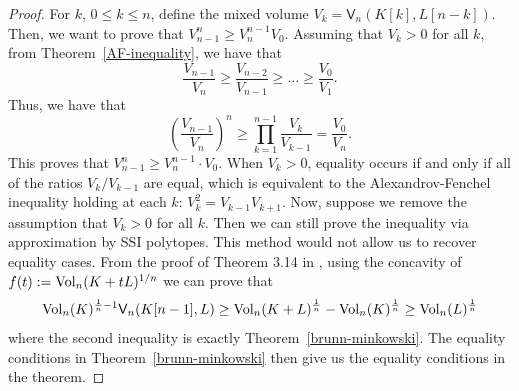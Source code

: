 \documentclass{puthesis-UG}
\begin{document}
\begin{proof}
	For $k$, $0 \leq k \leq n$, define the mixed volume $V_k = \mathsf{V}_n (K[k], L[n-k])$. Then, we want to prove that $V_{n-1}^n \geq V_n^{n-1}V_0$. Assuming that $V_k > 0$ for all $k$, from Theorem~\ref{AF-inequality}, we have that 
	\[
		\frac{V_{n-1}}{V_n} \geq \frac{V_{n-2}}{V_{n-1}} \geq \ldots \geq \frac{V_{0}}{V_1}.
	\]
	Thus, we have that 
	\[	
		\left ( \frac{V_{n-1}}{V_n} \right )^n \geq \prod_{k = 1}^{n-1} \frac{V_k}{V_{k-1}} = \frac{V_0}{V_n}.
	\]
	This proves that $V_{n-1}^n \geq V_n^{n-1} \cdot V_0$. When $V_k > 0$, equality occurs if and only if all of the ratios $V_k / V_{k-1}$ are equal, which is equivalent to the Alexandrov-Fenchel inequality holding at each $k$: $V_k^2 = V_{k-1} V_{k+1}$. Now, suppose we remove the assumption that $V_k > 0$ for all $k$. Then we can still prove the inequality via approximation by SSI polytopes. This method would not allow us to recover equality cases. From the proof of Theorem 3.14 in \cite{Hug2020-ue}, using the concavity of $f(t) := \operatorname{Vol}_n (K + t L)^{1/n}$ we can prove that 
	\[
		\operatorname{Vol}_n(K)^{\frac{1}{n} - 1} \mathsf{V}_n (K[n-1], L) \geq \operatorname{Vol}_n(K+L)^{\frac{1}{n}} - \operatorname{Vol}_n(K)^{\frac{1}{n}} \geq \operatorname{Vol}_n(L)^{\frac{1}{n}}
	\]
	where the second inequality is exactly Theorem~\ref{brunn-minkowski}. The equality conditions in Theorem~\ref{brunn-minkowski} then give us the equality conditions in the theorem. 
\end{proof}
\end{document}
